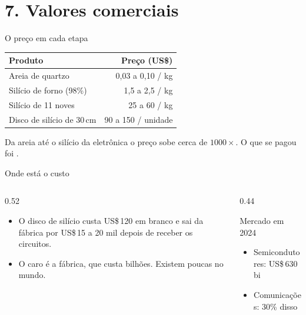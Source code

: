 \section{7. Valores comerciais}

\begin{frame}{O preço em cada etapa}
  \begin{table}
    \centering
    \begin{tabular}{lr}
      \toprule
      \textbf{Produto} & \textbf{Preço (US\$)} \\
      \midrule
      Areia de quartzo           & 0,03 a 0,10 / kg \\
      Silício de forno (98\%)    & 1,5 a 2,5 / kg \\
      Silício de 11 noves        & 25 a 60 / kg \\
      Disco de silício de 30\,cm & 90 a 150 / unidade \\
      \bottomrule
    \end{tabular}
  \end{table}
  \vspace{0.3cm}
  \centering
  Da areia até o silício da eletrônica o preço sobe cerca de
  \alert{$1000\times$}. O que se pagou foi .
\end{frame}

\begin{frame}{Onde está o custo}
  \begin{columns}[T]
    \begin{column}{0.52\linewidth}
      \begin{itemize}
        \item O disco de silício custa US\$\,120 em branco e sai da fábrica
              por \alert{US\$\,15 a 20 mil} depois de receber os circuitos.
        \item O caro é a fábrica, que custa bilhões. Existem poucas no mundo.
      \end{itemize}
    \end{column}
    \begin{column}{0.44\linewidth}
      \begin{block}{Mercado em 2024}
        \small
        \begin{itemize}
          \item Semicondutores: US\$\,630 bi
          \item Comunicações: 30\% disso
        \end{itemize}
      \end{block}
    \end{column}
  \end{columns}
  \vspace{0.4cm}
\end{frame}
